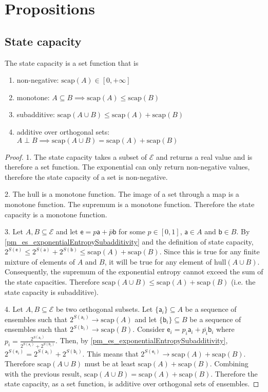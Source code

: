 \documentclass[10pt,twocolumn, nofootinbib]{revtex4-2}
\newcommand\hull{\mathrm{hull}}
\newcommand\capacity{\mathrm{scap}}
\newcommand{\ens}[1][e] {\mathsf{#1}} %
\newcommand{\Ens}[1][E] {\mathcal{#1}} %
\def\ortho{\perp}
\begin{document}
\section{Propositions}
\subsection{State capacity}
\begin{prop}
	The state capacity is a set function that is
	\begin{enumerate}
		\item non-negative: $\capacity(A) \in [0, +\infty]$
		\item monotone: $A \subseteq B \implies \capacity(A) \leq \capacity(B)$
		\item subadditive: $\capacity(A \cup B) \leq \capacity(A) + \capacity(B)$
		\item additive over orthogonal sets: $A \ortho B \implies \capacity(A \cup B) = \capacity(A) + \capacity(B)$ 
	\end{enumerate}
\end{prop}

\begin{proof}
	1. The state capacity takes a subset of $\Ens$ and returns a real value and is therefore a set function. The exponential can only return non-negative values, therefore the state capacity of a set is non-negative. 
	
	2. The $\hull$ is a monotone function. The image of a set through a map is a monotone function. The supremum is a monotone function. Therefore the state capacity is a monotone function.
	
	3. Let $A, B \subseteq \Ens$ and let $\ens = p \ens[a] + \bar{p} \ens[b]$ for some $p \in [0,1]$, $\ens[a] \in A$ and $\ens[b] \in B$. By \ref{pm_es_exponentialEntropySubadditivity} and the definition of state capacity, $2^{S(\ens)} \leq 2^{S(\ens[a])} + 2^{S(\ens[b])} \leq \capacity(A) + \capacity(B)$. Since this is true for any finite mixture of elements of $A$ and $B$, it will be true for any element of $\hull(A \cup B)$. Consequently, the supremum of the exponential entropy cannot exceed the sum of the state capacities. Therefore $\capacity(A \cup B) \leq \capacity(A) + \capacity(B)$ (i.e. the state capacity is subadditive).
	
	4. Let $A, B \subseteq \Ens$ be two orthogonal subsets. Let $\{\ens[a]_i\} \subseteq A$ be a sequence of ensembles such that $2^{S(\ens[a]_i)} \to \capacity(A)$ and let $\{\ens[b]_i\} \subseteq B$ be a sequence of ensembles such that $2^{S(\ens[b]_i)} \to \capacity(B)$. Consider $\ens_i = p_i \ens[a]_i + \bar{p_i} \ens[b]_i$ where $p_i = \frac{2^{S(\ens[a]_i)}}{2^{S(\ens[a]_i)} + 2^{S(\ens[b]_i)}}$. Then, by \ref{pm_es_exponentialEntropySubadditivity}, $2^{S(\ens_i)} = 2^{S(\ens[a]_i)} + 2^{S(\ens[b]_i)}$. This means that $2^{S(\ens_i)} \to \capacity(A) + \capacity(B)$. Therefore $\capacity(A \cup B)$ must be at least $\capacity(A) + \capacity(B)$. Combining with the previous result, $\capacity(A \cup B) = \capacity(A) + \capacity(B)$. Therefore the state capacity, as a set function, is additive over orthogonal sets of ensembles.
\end{proof}
\end{document}
